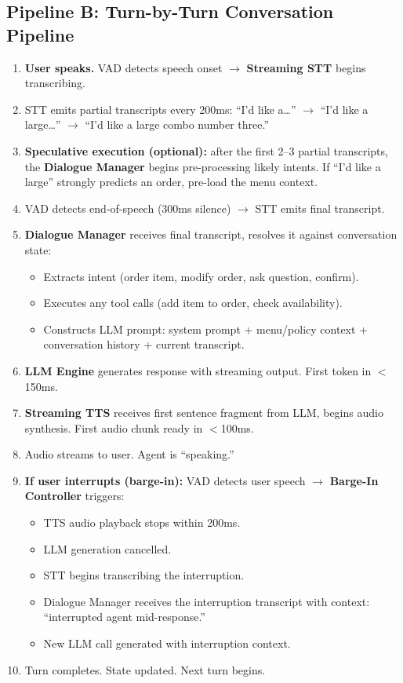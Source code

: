 \subsection*{Pipeline B: Turn-by-Turn Conversation Pipeline}
\begin{enumerate}
  \item \textbf{User speaks.} VAD detects speech onset $\rightarrow$ \textbf{Streaming STT} begins transcribing.
  \item STT emits partial transcripts every 200ms: ``I'd like a\ldots'' $\rightarrow$ ``I'd like a large\ldots'' $\rightarrow$ ``I'd like a large combo number three.''
  \item \textbf{Speculative execution (optional):} after the first 2--3 partial transcripts, the \textbf{Dialogue Manager} begins pre-processing likely intents. If ``I'd like a large'' strongly predicts an order, pre-load the menu context.
  \item VAD detects end-of-speech (300ms silence) $\rightarrow$ STT emits final transcript.
  \item \textbf{Dialogue Manager} receives final transcript, resolves it against conversation state:
  \begin{itemize}
    \item Extracts intent (order item, modify order, ask question, confirm).
    \item Executes any tool calls (add item to order, check availability).
    \item Constructs LLM prompt: system prompt + menu/policy context + conversation history + current transcript.
  \end{itemize}
  \item \textbf{LLM Engine} generates response with streaming output. First token in $<$150ms.
  \item \textbf{Streaming TTS} receives first sentence fragment from LLM, begins audio synthesis. First audio chunk ready in $<$100ms.
  \item Audio streams to user. Agent is ``speaking.''
  \item \textbf{If user interrupts (barge-in):} VAD detects user speech $\rightarrow$ \textbf{Barge-In Controller} triggers:
  \begin{itemize}
    \item TTS audio playback stops within 200ms.
    \item LLM generation cancelled.
    \item STT begins transcribing the interruption.
    \item Dialogue Manager receives the interruption transcript with context: ``interrupted agent mid-response.''
    \item New LLM call generated with interruption context.
  \end{itemize}
  \item Turn completes. State updated. Next turn begins.
\end{enumerate}

